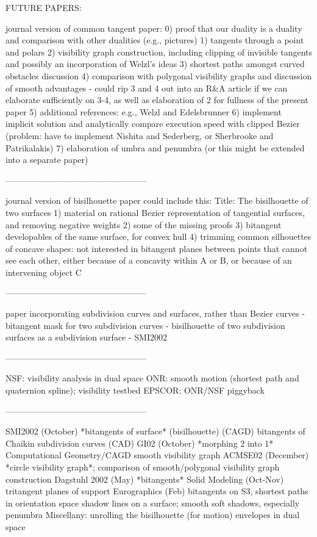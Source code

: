 FUTURE PAPERS:

journal version of common tangent paper:
0) proof that our duality is a duality 
	and comparison with other dualities (e.g., pictures)
1) tangents through a point and polars
2) visibility graph construction, including clipping of invisible tangents
	and possibly an incorporation of Welzl's ideas
3) shortest paths amongst curved obstacles discussion
4) comparison with polygonal visibility graphs and discussion of smooth advantages
	- could rip 3 and 4 out into an R&A article if we can elaborate
	  sufficiently on 3-4, as well as elaboration of 2 for fullness of the present paper
5) additional references: e.g., Welzl and Edelsbrunner
6) implement implicit solution and analytically compare execution speed
	with clipped Bezier (problem: have to implement Nishita and Sederberg,
	or Sherbrooke and Patrikalakis)
7) elaboration of umbra and penumbra (or this might be extended into a
	separate paper)

--------------------------------------------------

journal version of bisilhouette paper could include this:
Title: The bisilhouette of two surfaces
1) material on rational Bezier representation of tangential surfaces, 
	and removing negative weights
2) some of the missing proofs
3) bitangent developables of the same surface, for convex hull
4) trimming common silhouettes of concave shapes: not interested in
	bitangent planes between points that cannot see each other,
	either because of a concavity within A or B,
	or because of an intervening object C
	
--------------------------------------------------
	
paper incorporating subdivision curves and surfaces, rather than Bezier curves
 - bitangent mask for two subdivision curves
 - bisilhouette of two subdivision surfaces as a subdivision surface
 - SMI2002
 
--------------------------------------------------

NSF: visibility analysis in dual space
ONR: smooth motion (shortest path and quaternion spline); visibility testbed
EPSCOR: ONR/NSF piggyback
 
--------------------------------------------------

SMI2002  (October)	     *bitangents of surface* (bisilhouette) (CAGD)
			     bitangents of Chaikin subdivision curves (CAD)
GI02     (October)	     *morphing 2 into 1*
Computational Geometry/CAGD  smooth visibility graph
ACMSE02 (December)	     *circle visibility graph*; comparison of smooth/polygonal visibility graph construction
Dagstuhl 2002 (May)	     *bitangents*
Solid Modeling (Oct-Nov)     tritangent planes of support     
Eurographics (Feb)	     bitangents on S3, shortest paths in orientation space
			     shadow lines on a surface; smooth soft shadows, especially penumbra
Miscellany: 		     unrolling the bisilhouette (for motion)
			     envelopes in dual space
 
